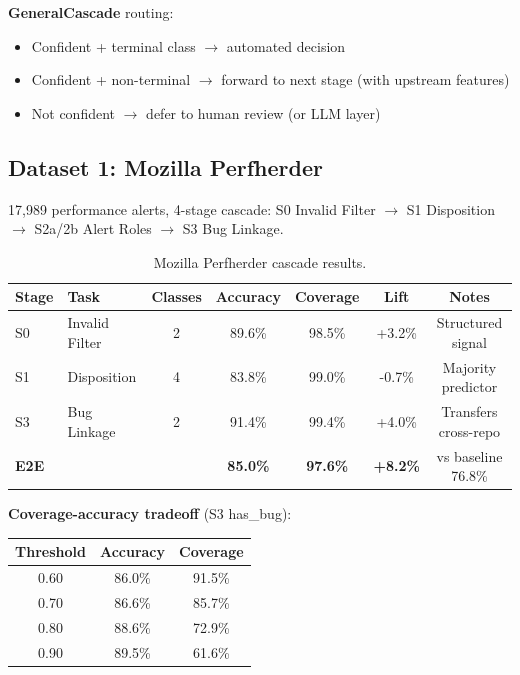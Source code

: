 \documentclass[11pt]{article}
\begin{document}
\textbf{GeneralCascade} routing:
\begin{itemize}
    \item Confident + terminal class $\rightarrow$ automated decision
    \item Confident + non-terminal $\rightarrow$ forward to next stage (with upstream features)
    \item Not confident $\rightarrow$ defer to human review (or LLM layer)
\end{itemize}

\subsection{Dataset 1: Mozilla Perfherder}

17,989 performance alerts, 4-stage cascade: S0 Invalid Filter $\rightarrow$ S1 Disposition $\rightarrow$ S2a/2b Alert Roles $\rightarrow$ S3 Bug Linkage.

\begin{table}[h]
\centering
\caption{Mozilla Perfherder cascade results.}
\label{tab:mozilla-cascade}
\begin{tabular}{llccccc}
\toprule
\textbf{Stage} & \textbf{Task} & \textbf{Classes} & \textbf{Accuracy} & \textbf{Coverage} & \textbf{Lift} & \textbf{Notes} \\
\midrule
S0 & Invalid Filter & 2 & 89.6\% & 98.5\% & +3.2\% & Structured signal \\
S1 & Disposition & 4 & 83.8\% & 99.0\% & -0.7\% & Majority predictor \\
S3 & Bug Linkage & 2 & 91.4\% & 99.4\% & +4.0\% & Transfers cross-repo \\
\textbf{E2E} & & & \textbf{85.0\%} & \textbf{97.6\%} & \textbf{+8.2\%} & vs baseline 76.8\% \\
\bottomrule
\end{tabular}
\end{table}

\textbf{Coverage-accuracy tradeoff} (S3 has\_bug):

\begin{table}[h]
\centering
\begin{tabular}{ccc}
\toprule
\textbf{Threshold} & \textbf{Accuracy} & \textbf{Coverage} \\
\midrule
0.60 & 86.0\% & 91.5\% \\
0.70 & 86.6\% & 85.7\% \\
0.80 & 88.6\% & 72.9\% \\
0.90 & 89.5\% & 61.6\% \\
\bottomrule
\end{tabular}
\end{table}
\end{document}
